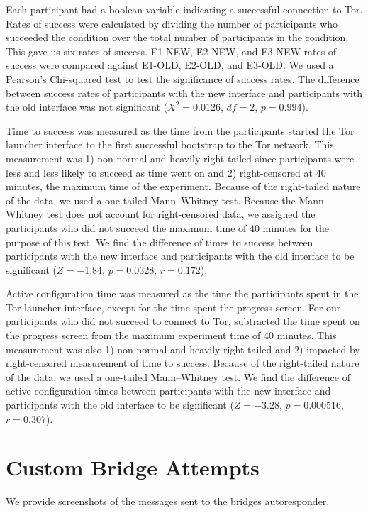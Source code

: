 \documentclass[USenglish,oneside,twocolumn]{article}
\begin{document}
Each participant had a boolean variable indicating a successful connection to Tor. Rates of success were calculated by dividing the number of participants who succeeded the condition over the total number of participants in the condition. This gave us six rates of success. E1-NEW, E2-NEW, and E3-NEW rates of success were compared against E1-OLD, E2-OLD, and E3-OLD.  We used a Pearson's Chi-squared test to test the significance of success rates. The difference between success rates of participants with the new interface and participants with the old interface was not significant ($X^2 = 0.0126$, $df = 2$, $p = 0.994$).

Time to success was measured as the time from the participants started the Tor launcher interface to the first successful bootstrap to the Tor network. This measurement was 1) non-normal and heavily right-tailed since participants were less and less likely to succeed as time went on and 2) right-censored at 40 minutes, the maximum time of the experiment. Because of the right-tailed nature of the data, we used a one-tailed Mann--Whitney test. Because the Mann--Whitney test does not account for right-censored data, we assigned the participants who did not succeed the maximum time of 40 minutes for the purpose of this test. We find the difference of times to success between participants with the new interface and participants with the old interface to be significant ($ Z = -1.84$, $p = 0.0328$, $r= 0.172$). 

Active configuration time was measured as the time the participants spent in the Tor launcher interface, except for the time spent the progress screen. For our participants who did not succeed to connect to Tor, subtracted the time spent on the progress screen from the maximum experiment time of 40 minutes. This measurement was also 1) non-normal and heavily right tailed and 2) impacted by right-censored measurement of time to success. Because of the right-tailed nature of the data, we used a one-tailed Mann--Whitney test. We find the difference of active configuration times between participants with the new interface and participants with the old interface to be significant ($Z = -3.28$, $p = 0.000516$, $r = 0.307$).

\section{Custom Bridge Attempts} 
We provide screenshots of the messages sent to the bridges autoresponder. 
\label{custom}
\end{document}
